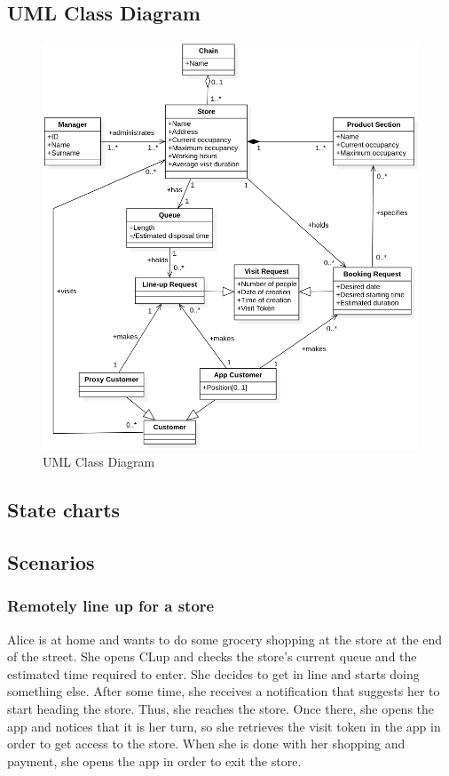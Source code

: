 \documentclass[a4paper,oneside,11pt]{book}   %
\begin{document}
    \subsection{UML Class Diagram} 
    \begin{figure}[H]
        \centering
        \includegraphics[width=\textwidth, height=\textheight, keepaspectratio]{pictures/uml_class_diagram}
        \caption{UML Class Diagram}
        \label{figure:uml}
    \end{figure}
    \subsection{State charts}
    \subsection{Scenarios}
        \subsubsection{Remotely line up for a store}
        Alice is at home and wants to do some grocery shopping at the store at the end of the street. She opens CLup and checks the store’s current queue and the estimated time required to enter. She decides to get in line and starts doing something else. After some time, she receives a notification that suggests her to start heading the store. Thus, she reaches the store. Once there, she opens the app and notices that it is her turn,  so she retrieves the visit token in the app in order to get access to the store. When she is done with her shopping and payment, she opens the app in order to exit the store.
\end{document}
